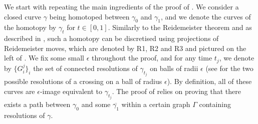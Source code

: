 \documentclass{article}
\begin{document}
We start with repeating the main ingredients of the proof of . We consider a closed curve $\gamma$ being homotoped between $\gamma_0$ and $\gamma_1$, and we denote the curves of the homotopy by $\gamma_t$ for $t\in [0,1]$. Similarly to the Reidemeister theorem and as described in \cite[Proposition 2.1]{Chambers_homo-isotopy}, such a homotopy can be discretised using projections of Reidemeister moves, which are denoted by R1, R2 and R3 and pictured on the left of . We fix some small $\epsilon$ throughout the proof, and for any time $t_j$, we denote by $\{ G^j_i \}_i$ the set of connected resolutions of $\gamma_{t_j}$ on balls of radii $\epsilon$ (see  for the two possible resolutions of a crossing on a ball of radius $\epsilon$). By definition, all of these curves are $\epsilon$-image equivalent to $\gamma_{t_j}$. The proof of  relies on proving that there exists a path between $\gamma_0$ and some $\overline{\gamma_1}$ within a certain graph $\Gamma$ containing resolutions of $\gamma$.
\end{document}
